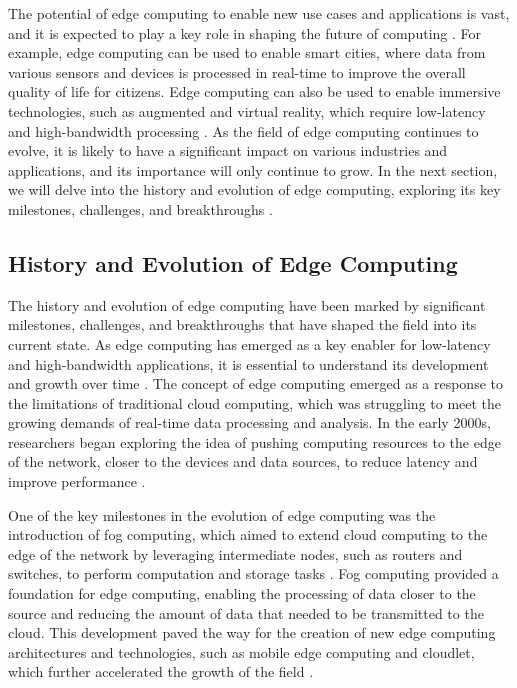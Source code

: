 \documentclass[11pt]{article}
\begin{document}
The potential of edge computing to enable new use cases and applications is vast, and it is expected to play a key role in shaping the future of computing \cite{ref8}. For example, edge computing can be used to enable smart cities, where data from various sensors and devices is processed in real-time to improve the overall quality of life for citizens. Edge computing can also be used to enable immersive technologies, such as augmented and virtual reality, which require low-latency and high-bandwidth processing \cite{ref9}. As the field of edge computing continues to evolve, it is likely to have a significant impact on various industries and applications, and its importance will only continue to grow. In the next section, we will delve into the history and evolution of edge computing, exploring its key milestones, challenges, and breakthroughs \cite{ref2}.

\subsection{History and Evolution of Edge Computing}

The history and evolution of edge computing have been marked by significant milestones, challenges, and breakthroughs that have shaped the field into its current state. As edge computing has emerged as a key enabler for low-latency and high-bandwidth applications, it is essential to understand its development and growth over time \cite{ref2}. The concept of edge computing emerged as a response to the limitations of traditional cloud computing, which was struggling to meet the growing demands of real-time data processing and analysis. In the early 2000s, researchers began exploring the idea of pushing computing resources to the edge of the network, closer to the devices and data sources, to reduce latency and improve performance \cite{ref10}.

One of the key milestones in the evolution of edge computing was the introduction of fog computing, which aimed to extend cloud computing to the edge of the network by leveraging intermediate nodes, such as routers and switches, to perform computation and storage tasks \cite{ref11}. Fog computing provided a foundation for edge computing, enabling the processing of data closer to the source and reducing the amount of data that needed to be transmitted to the cloud. This development paved the way for the creation of new edge computing architectures and technologies, such as mobile edge computing and cloudlet, which further accelerated the growth of the field \cite{ref12}.
\end{document}
